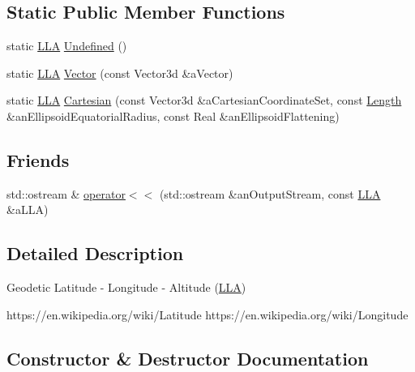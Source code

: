 \subsection*{Static Public Member Functions}
\begin{DoxyCompactItemize}
\item 
static \hyperlink{classostk_1_1physics_1_1coord_1_1spherical_1_1_l_l_a}{L\+LA} \hyperlink{classostk_1_1physics_1_1coord_1_1spherical_1_1_l_l_a_ac02d0b9cb58f21d188ea025521f17c65}{Undefined} ()
\item 
static \hyperlink{classostk_1_1physics_1_1coord_1_1spherical_1_1_l_l_a}{L\+LA} \hyperlink{classostk_1_1physics_1_1coord_1_1spherical_1_1_l_l_a_a4a62e2c9995057dc14d1606e6be65fb8}{Vector} (const Vector3d \&a\+Vector)
\item 
static \hyperlink{classostk_1_1physics_1_1coord_1_1spherical_1_1_l_l_a}{L\+LA} \hyperlink{classostk_1_1physics_1_1coord_1_1spherical_1_1_l_l_a_a9f28bdd9f66bdb51749fcf592a25507d}{Cartesian} (const Vector3d \&a\+Cartesian\+Coordinate\+Set, const \hyperlink{classostk_1_1physics_1_1units_1_1_length}{Length} \&an\+Ellipsoid\+Equatorial\+Radius, const Real \&an\+Ellipsoid\+Flattening)
\end{DoxyCompactItemize}
\subsection*{Friends}
\begin{DoxyCompactItemize}
\item 
std\+::ostream \& \hyperlink{classostk_1_1physics_1_1coord_1_1spherical_1_1_l_l_a_a4e052cf41d11b11c943ad32cd4c25ba8}{operator$<$$<$} (std\+::ostream \&an\+Output\+Stream, const \hyperlink{classostk_1_1physics_1_1coord_1_1spherical_1_1_l_l_a}{L\+LA} \&a\+L\+LA)
\end{DoxyCompactItemize}


\subsection{Detailed Description}
Geodetic Latitude -\/ Longitude -\/ Altitude (\hyperlink{classostk_1_1physics_1_1coord_1_1spherical_1_1_l_l_a}{L\+LA}) 

https\+://en.wikipedia.\+org/wiki/\+Latitude https\+://en.wikipedia.\+org/wiki/\+Longitude 

\subsection{Constructor \& Destructor Documentation}
\mbox{\label{classostk_1_1physics_1_1coord_1_1spherical_1_1_l_l_a_a5a168b8087f0cfabca76b82870f6324a}} 
